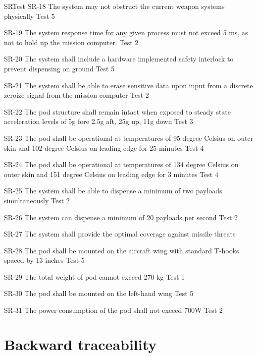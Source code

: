 \documentclass[Main]{subfiles}
\begin{document}
\begin{TraceForward}{SR}{Test}
\TF
{SR-18}
{The system may not obstruct the current weapon systems physically}
{Test 5}

\TF
{SR-19}
{The system response time for any given process must not exceed 5 ms, as not to hold up the mission computer.}
{Test 2}

\TF
{SR-20}
{The system shall include a hardware implemented safety interlock to prevent dispensing on ground}
{Test 5}

\TF
{SR-21}
{The system shall be able to erase sensitive data upon input from a discrete zeroize signal from the mission computer}
{Test 2}

\TF
{SR-22}
{The pod structure shall remain intact when exposed to steady state acceleration levels of 5g fore 2.5g aft, 25g up, 11g down}
{Test 3}

\TF
{SR-23}
{The pod shall be operational at temperatures of 95 degree Celsius on outer skin and 102 degree Celsius on leading edge for 25 minutes}
{Test 4}

\TF
{SR-24}
{The pod shall be operational at temperatures of 134 degree Celsius on outer skin and 151 degree Celsius on leading edge for 3 minutes}
{Test 4}

\TF
{SR-25}
{The system shall be able to dispense a minimum of two payloads simultaneously}
{Test 2}

\TF
{SR-26}
{The system can dispense a minimum of 20 payloads per second}
{Test 2}

\TF
{SR-27}
{The system shall provide the optimal coverage against	missile threats}
{}

\TF
{SR-28}
{The pod shall be mounted on the aircraft wing with standard T-hooks spaced by 13 inches}
{Test 5}

\TF
{SR-29}
{The total weight of pod cannot exceed 270 kg}
{Test 1}

\TF
{SR-30}
{The pod shall be mounted on the left-hand wing}
{Test 5}

\TF
{SR-31}
{The power consumption of the pod shall not exceed 700W}
{Test 2}

\end{TraceForward}

\chapter{Backward traceability}
\end{document}
